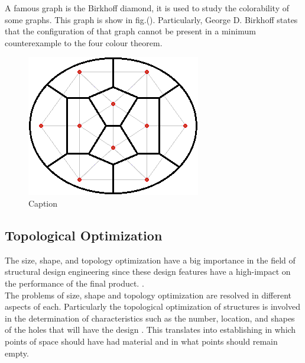 \documentclass[10pt]{article}
\begin{document}
A famous graph is the Birkhoff diamond, it is used to study the colorability of some graphs\cite{tilley2018birkhoff}. This graph is show in fig.(). Particularly, George D. Birkhoff states that the configuration of that graph cannot be present in a minimum counterexample to the four colour theorem.

\begin{figure}[H]
    \centering
		\includegraphics[scale=0.75]{images/Birkhoff_diamond.png}
    \caption{Caption}
    \label{fig:my_label}
\end{figure}





\subsection{Topological Optimization}

The size, shape, and topology optimization have a big importance in the field of structural design engineering since these design features have a high-impact on the performance of the final product. \cite{Benditoe2003topology}. \\

The problems of size, shape and topology optimization are resolved in different aspects of each. Particularly the topological optimization of structures is involved in the determination of characteristics such as the number, location, and shapes of the holes that will have the design \cite{bendsoe2003topology}. This translates into establishing in which points of space should have had material and in what points should remain empty.\\
\end{document}
